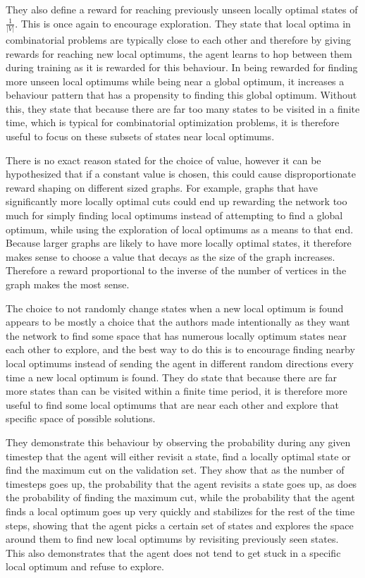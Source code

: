 \documentclass{article}
\begin{document}
They also define a reward for reaching previously unseen locally optimal states of $\frac{1}{|V|}$. This is once again to encourage exploration. They state that local optima in combinatorial problems are typically close to each other and therefore by giving rewards for reaching new local optimums, the agent learns to hop between them during training as it is rewarded for this behaviour. In being rewarded for finding more unseen local optimums while being near a global optimum, it increases a behaviour pattern that has a propensity to finding this global optimum. Without this, they state that because there are far too many states to be visited in a finite time, which is typical for combinatorial optimization problems, it is therefore useful to focus on these subsets of states near local optimums.

There is no exact reason stated for the choice of value, however it can be hypothesized that if a constant value is chosen, this could cause disproportionate reward shaping on different sized graphs. For example, graphs that have significantly more locally optimal cuts could end up rewarding the network too much for simply finding local optimums instead of attempting to find a global optimum, while using the exploration of local optimums as a means to that end. Because larger graphs are likely to have more locally optimal states, it therefore makes sense to choose a value that decays as the size of the graph increases. Therefore a reward proportional to the inverse of the number of vertices in the graph makes the most sense. 

The choice to not randomly change states when a new local optimum is found appears to be mostly a choice that the authors made intentionally as they want the network to find some space that has numerous locally optimum states near each other to explore, and the best way to do this is to encourage finding nearby local optimums instead of sending the agent in different random directions every time a new local optimum is found. They do state that because there are far more states than can be visited within a finite time period, it is therefore more useful to find some local optimums that are near each other and explore that specific space of possible solutions.

They demonstrate this behaviour by observing the probability during any given timestep that the agent will either revisit a state, find a locally optimal state or find the maximum cut on the validation set. They show that as the number of timesteps goes up, the probability that the agent revisits a state goes up, as does the probability of finding the maximum cut, while the probability that the agent finds a local optimum goes up very quickly and stabilizes for the rest of the time steps, showing that the agent picks a certain set of states and explores the space around them to find new local optimums by revisiting previously seen states. This also demonstrates that the agent does not tend to get stuck in a specific local optimum and refuse to explore. 
\end{document}
